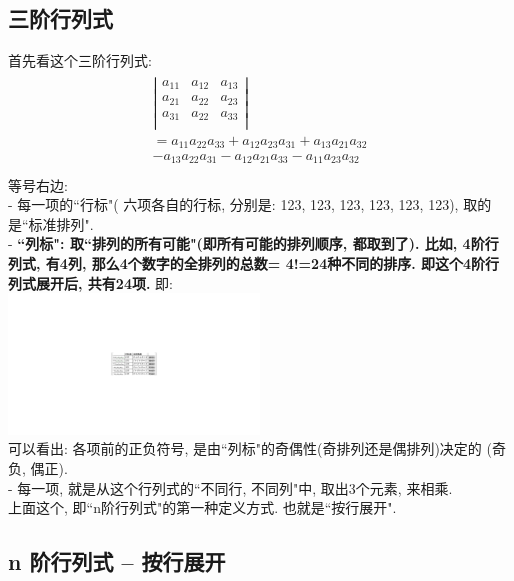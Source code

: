 \documentclass[UTF8]{ctexart}
\begin{document}
	\subsection{三阶行列式}
	首先看这个三阶行列式: 
	\begin{align*}
		\begin{matrix}
			\left| \begin{matrix}
				a_{11}&		a_{12}&		a_{13}\\
				a_{21}&		a_{22}&		a_{23}\\
				a_{31}&		a_{22}&		a_{33}\\
			\end{matrix} \right|\\
			=a_{11}a_{22}a_{33}+a_{12}a_{23}a_{31}+a_{13}a_{21}a_{32}\\
			-a_{13}a_{22}a_{31}-a_{12}a_{21}a_{33}-a_{11}a_{23}a_{32}\\
		\end{matrix}
	\end{align*} 
	等号右边: \\
	- 每一项的``行标"( 六项各自的行标, 分别是: 123, 123, 123, 123, 123, 123), 取的是``标准排列".	\\
	- \textbf{``列标": 取``排列的所有可能"(即所有可能的排列顺序, 都取到了). 比如, 4阶行列式, 有4列, 那么4个数字的全排列的总数= 4!=24种不同的排序. 即这个4阶行列式展开后, 共有24项.}  即: \\
	\includegraphics[width=0.5\textwidth]{img/0002.pdf}\\
	
	可以看出: 各项前的正负符号, 是由``列标"的奇偶性(奇排列还是偶排列)决定的 (奇负, 偶正).\\
	- 每一项, 就是从这个行列式的``不同行, 不同列"中, 取出3个元素, 来相乘.\\
	
	上面这个, 即``n阶行列式"的第一种定义方式. 也就是``按行展开".\\
	
	
	\subsection{n 阶行列式 -- 按行展开}
	
\end{document}
